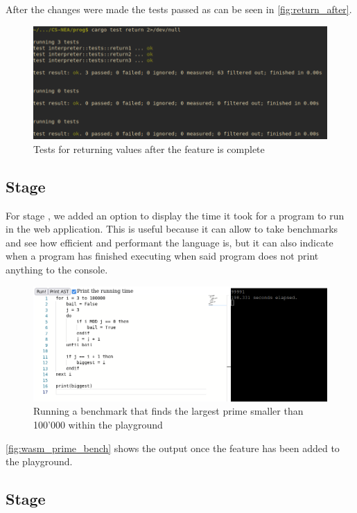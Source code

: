 \documentclass{article}
\newcommand{\subsecnum}{\the\value{subsection}}
\begin{document}
After the changes were made the tests passed as can be seen in
\autoref{fig:return_after}.

\begin{figure}
	\includegraphics[width=\textwidth]{return_after}
	\caption{Tests for returning values after the feature is complete}
	\label{fig:return_after}
\end{figure}

\subsection{Stage \subsecnum}

For stage \subsecnum, we added an option to display the time it took for a
program to run in the web application. This is useful because it can allow to
take benchmarks and see how efficient and performant the language is, but it
can also indicate when a program has finished executing when said program does
not print anything to the console.

\begin{figure}
	\includegraphics[width=\textwidth]{wasm_prime_bench}
	\caption{Running a benchmark that finds the largest prime smaller than
	100'000 within the playground}
	\label{fig:wasm_prime_bench}
\end{figure}

\autoref{fig:wasm_prime_bench} shows the output once the feature has been added
to the playground.

\subsection{Stage \subsecnum}
\label{sec:better_errors}
\end{document}
